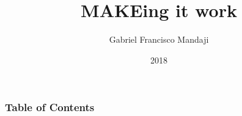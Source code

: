 \documentclass{beamer}
\title{MAKEing it work}
\author{Gabriel Francisco Mandaji}
\institute{LKCamp}
\date{2018}
\begin{document}
\frame{\titlepage}

\begin{frame}
    \frametitle{Table of Contents}
    \tableofcontents[subsectionstyle=hide]
\end{frame}






\end{document}
